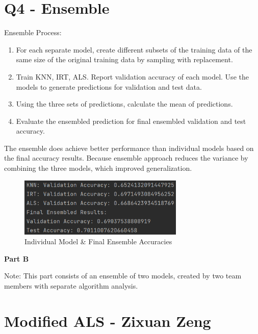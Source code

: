 \documentclass{article}
\begin{document}
\section*{Q4 - Ensemble}
Ensemble Process:
\begin{enumerate}
    \item For each separate model, create different subsets of the training data of the same size of the original training data by sampling with replacement. 
    \item Train KNN, IRT, ALS. Report validation accuracy of each model. Use the models to generate predictions for validation and test data.
    \item Using the three sets of predictions, calculate the mean of predictions.
    \item Evaluate the ensembled prediction for final ensembled validation and test accuracy.
\end{enumerate}
The ensemble does achieve better performance than individual models based on the final accuracy results. Because ensemble approach reduces the variance by combining the three models, which improved generalization.
\begin{figure}[H]
    \centering
    \includegraphics[width=0.7\textwidth]{4.png}
    \caption{Individual Model \& Final Ensemble Accuracies}
\end{figure}
\newpage


\vspace*{5cm}
\begin{center}
\Large\bfseries Part B
\end{center}
Note: This part consists of an ensemble of two models, created by two team members with separate algorithm analysis.
\newpage

\section*{Modified ALS - Zixuan Zeng}
\end{document}
